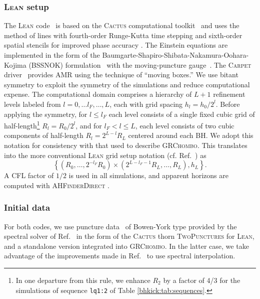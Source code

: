 \subsubsection{\textsc{Lean} setup}
\label{bhkick:sec:lean}
The \textsc{Lean} code~\cite{Sperhake:2006cy} is based on the 
\textsc{Cactus} computational toolkit~\cite{Goodale2002a} and uses 
the method of lines with fourth-order Runge-Kutta time stepping and 
sixth-order spatial stencils for improved phase accuracy 
\cite{Husa:2007hp}. The Einstein equations are implemented in the form 
of the Baumgarte-Shapiro-Shibata-Nakamura-Oohara-Kojima (BSSNOK) 
formulation~\cite{Nakamura:1987zz,Shibata:1995we,Baumgarte:1998te} 
with the moving-puncture gauge~\cite{Campanelli:2005dd,Baker:2005vv}. 
The \textsc{Carpet} driver~\cite{Schnetter:2003rb} provides AMR using 
the technique of ``moving boxes.'' We use bitant symmetry to exploit 
the symmetry of the simulations and reduce computational expense. 
The computational domain 
comprises a hierarchy of $L+1$ refinement levels labeled from 
$l=0,\ldots l_F,\ldots,L$, each with grid spacing $h_l=h_0/2^l$. 
Before applying the symmetry, for $l\leq l_F$ each level consists of 
a single fixed cubic grid of half-length\footnote{In one departure from
this rule, we enhance $R_2$ by a factor of 4/3 for the simulations
of sequence \texttt{lq1:2} of Table \ref{bhkick:tab:sequences}.}
$R_l=R_0/2^l$, and for 
$l_F<l\leq L$, each level consists of two cubic components of 
half-length $R_l=2^{L-l}R_L$ centered around each BH. We adopt this 
notation for consistency with that used to describe \textsc{GRChombo}. 
This translates into the more conventional \textsc{Lean} grid setup 
notation (cf. Ref.~\cite{Sperhake:2006cy}) as
\begin{equation}
    \left\{(R_0,\ldots,2^{-l_F}R_0) \times 
    (2^{L-l_F-1}R_L,\ldots,R_L),h_L\right\}.
\end{equation}
A CFL factor of $1/2$ is used in all simulations, and apparent horizons 
are computed with \textsc{AHFinderDirect}
\cite{Thornburg:1995cp,Thornburg:2003sf}.

\subsubsection{Initial data}
For both codes, we use puncture data~\cite{Brandt:1997tf} of
Bowen-York \cite{Bowen:1980yu} type provided by the spectral solver of
Ref.~\cite{Ansorg:2004ds} in the form of the \textsc{Cactus} thorn
\textsc{TwoPunctures} for \textsc{Lean}, and a standalone version
integrated into \textsc{GRChombo}.  In the latter case, we take
advantage of the improvements made in Ref.~\cite{Paschalidis:2013oya}
to use spectral interpolation.

